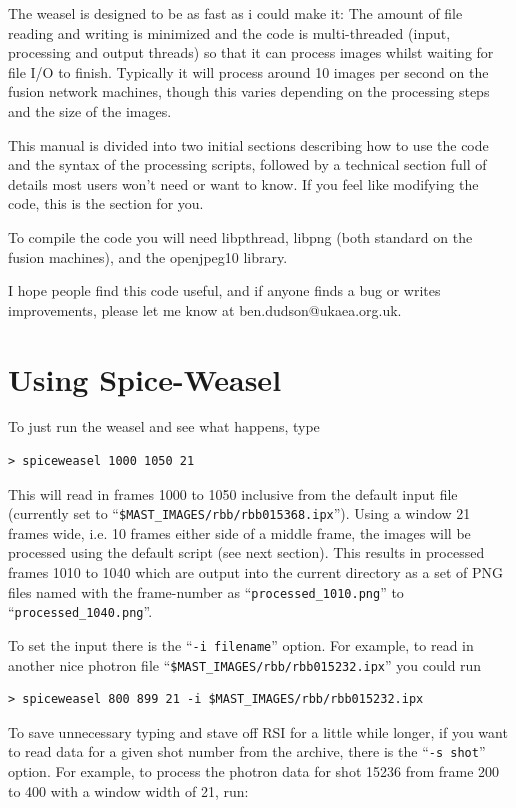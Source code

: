 \documentclass[12pt, a4paper]{article}
\begin{document}
The weasel is designed to be as fast as i could make it: The amount of file reading
and writing is minimized and the code is multi-threaded (input, processing and output threads)
so that it can process images whilst waiting for file I/O to finish. Typically it will
process around 10 images per second on the fusion network machines, though this varies
depending on the processing steps and the size of the images.

This manual is divided into two initial sections describing how to use the code and the syntax
of the processing scripts, followed by a
technical section full of details most users won't need or want to know.
If you feel like modifying the code, this is the section for you.

To compile the code you will need libpthread, libpng (both standard on the fusion machines),
and the openjpeg10 library.

I hope people find this code useful, and if anyone finds a bug or writes improvements, please
let me know at ben.dudson@ukaea.org.uk. 

\section{Using Spice-Weasel}

To just run the weasel and see what happens, type

\begin{verbatim}
> spiceweasel 1000 1050 21 
\end{verbatim}

This will read in frames 1000 to 1050 inclusive from the default input file
(currently set to ``\texttt{\$MAST\_IMAGES/rbb/rbb015368.ipx}''). Using a window 21 frames wide,
i.e. 10 frames either side of a middle frame, the images will be processed using
the default script (see next section). This results in processed frames 1010 to 1040
which are output into the current directory as a set of PNG files named with the frame-number
as ``\texttt{processed\_1010.png}'' to ``\texttt{processed\_1040.png}''.

To set the input there is the ``\texttt{-i filename}'' option. For example, to read in another
nice photron file ``\texttt{\$MAST\_IMAGES/rbb/rbb015232.ipx}'' you could run

\begin{verbatim}
> spiceweasel 800 899 21 -i $MAST_IMAGES/rbb/rbb015232.ipx
\end{verbatim}

To save unnecessary typing and stave off RSI for a little while longer, 
if you want to read data for a given shot number from
the archive, there is the ``\texttt{-s shot}'' option. For example, to process the photron data for
shot 15236 from frame 200 to 400 with a window width of 21, run:
\end{document}
